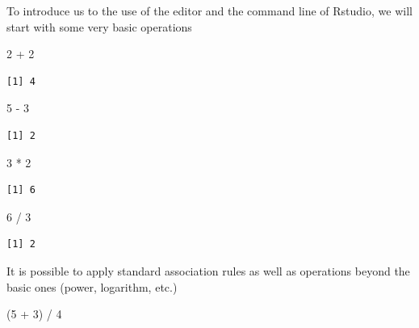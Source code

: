 \documentclass[
  letterpaper,
  DIV=11,
  numbers=noendperiod]{scrartcl}
\newenvironment{Shaded}{\begin{snugshade}}{\end{snugshade}}
\newcommand{\DecValTok}[1]{\textcolor[rgb]{0.68,0.00,0.00}{#1}}
\newcommand{\NormalTok}[1]{\textcolor[rgb]{0.00,0.23,0.31}{#1}}
\newcommand{\SpecialCharTok}[1]{\textcolor[rgb]{0.37,0.37,0.37}{#1}}
\begin{document}
To introduce us to the use of the editor and the command line of
Rstudio, we will start with some very basic operations

\begin{Shaded}
\begin{Highlighting}[]
\DecValTok{2} \SpecialCharTok{+} \DecValTok{2}
\end{Highlighting}
\end{Shaded}

\begin{verbatim}
[1] 4
\end{verbatim}

\begin{Shaded}
\begin{Highlighting}[]
\DecValTok{5} \SpecialCharTok{{-}} \DecValTok{3}
\end{Highlighting}
\end{Shaded}

\begin{verbatim}
[1] 2
\end{verbatim}

\begin{Shaded}
\begin{Highlighting}[]
\DecValTok{3} \SpecialCharTok{*} \DecValTok{2}
\end{Highlighting}
\end{Shaded}

\begin{verbatim}
[1] 6
\end{verbatim}

\begin{Shaded}
\begin{Highlighting}[]
\DecValTok{6} \SpecialCharTok{/} \DecValTok{3}
\end{Highlighting}
\end{Shaded}

\begin{verbatim}
[1] 2
\end{verbatim}

It is possible to apply standard association rules as well as operations
beyond the basic ones (power, logarithm, etc.)

\begin{Shaded}
\begin{Highlighting}[]
\NormalTok{(}\DecValTok{5} \SpecialCharTok{+} \DecValTok{3}\NormalTok{) }\SpecialCharTok{/} \DecValTok{4}
\end{Highlighting}
\end{Shaded}
\end{document}
